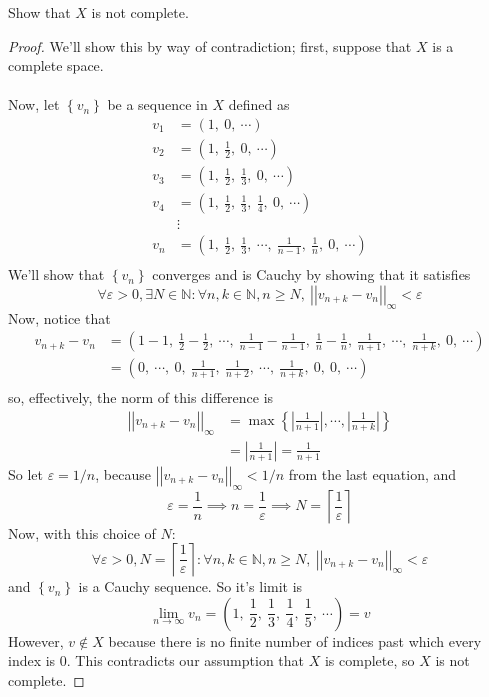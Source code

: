 \documentclass{article}
\newcommand{\norm}[1]{\left|\left|#1\right|\right|}
\newcommand{\abs}[1]{\left|#1\right|}
\newcommand{\parens}[1]{\left(#1\right)}
\newcommand{\bracks}[1]{\left\{#1\right\}}
\newcommand{\vep}{\varepsilon}
\newcommand{\ceiling}[1]{\left\lceil#1\right\rceil}
\newcommand{\N}{\mathbb{N}}
\begin{document}
    \item
    Show that $X$ is not complete.
    \begin{proof}
    We'll show this by way of contradiction; first, suppose that $X$
    is a complete space.\\\\ 
    Now, let $\bracks{v_n}$ be a sequence in $X$ defined as
    \begin{align*}
    v_1 &= \parens{1,\ 0,\ \cdots} \\
    v_2 &= \parens{1,\ \frac{1}{2},\ 0,\ \cdots} \\
    v_3 &= \parens{1,\ \frac{1}{2},\ \frac{1}{3},\ 0,\ \cdots} \\
    v_4 &= \parens{1,\ \frac{1}{2},\ \frac{1}{3},\ \frac{1}{4},\ 
    0,\ \cdots} \\
    &\vdots \\
    v_n &= \parens{1,\ \frac{1}{2},\ \frac{1}{3},\ \cdots,\ 
    \frac{1}{n-1},\ \frac{1}{n},\ 0,\ \cdots} \\
    \end{align*}
    We'll show that $\bracks{v_n}$ converges and is Cauchy by showing
    that it satisfies
    $$\forall \vep > 0, \exists N \in \N: \forall n, k \in \N,
    n \geq N,\ \norm{v_{n+k} - v_n}_\infty < \vep$$
    Now, notice that 
    \begin{align*}
    v_{n+k} - v_n &= \parens{1-1,\ \frac{1}{2} - \frac{1}{2},\ 
    \cdots,\ \frac{1}{n-1} - \frac{1}{n-1},\ \frac{1}{n} - 
    \frac{1}{n},\ \frac{1}{n+1},\ \cdots,\ \frac{1}{n+k},\ 0,\ 
    \cdots} \\
    &= \parens{0,\
    \cdots,\ 0,\ \frac{1}{n+1},\ \frac{1}{n+2},\ \cdots,\ 
    \frac{1}{n+k},\ 0,\ 0,\ 
    \cdots} \\
    \end{align*}
    so, effectively, the norm of this difference is
    \begin{align*}
    \norm{v_{n+k} - v_n}_\infty &= \max\bracks{\abs{\frac{1}{n+1}},
    \cdots,\abs{\frac{1}{n+k}}} \\
    &= \abs{\frac{1}{n+1}} = \frac{1}{n+1}
    \end{align*}
    So let $\vep = 1/n$, because $\norm{v_{n+k} - v_n}_\infty < 1/n$
    from the last equation, and 
    $$\vep = \frac{1}{n} \implies n = \frac{1}{\vep} \implies N 
    = \ceiling{\frac{1}{\vep}}$$
    Now, with this choice of $N$:
    $$\forall \vep > 0, N=\ceiling{\frac{1}{\vep}}: 
    \forall n, k \in \N,
    n \geq N,\ \norm{v_{n+k} - v_n}_\infty < \vep$$
    and $\bracks{v_n}$ is a Cauchy sequence. So it's limit is
    $$\lim_{n\to\infty}v_n  =
    \parens{1,\ \frac{1}{2},\ \frac{1}{3},\ \frac{1}{4},\ 
    \frac{1}{5},\ \cdots} = v$$
    However, $v \notin X$ because there is no finite number of 
    indices past which every index is 0. This contradicts our 
    assumption that $X$ is complete, so $X$ is not complete. 
    \end{proof}
    
\end{document}

